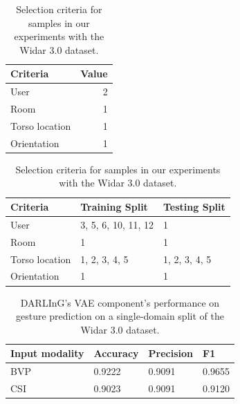 \begin{table}[t]
	\centering
	\begin{subtable}{0.3\textwidth}
		\centering
		\begin{tabular}{@{}lr@{}}
			\toprule
			Criteria       & Value \\ \midrule
			User           & 2     \\
			Room           & 1     \\
			Torso location & 1     \\
			Orientation    & 1     \\ \bottomrule
		\end{tabular}
		\caption{Single-domain split criteria.}
		\label{tab:single-domain-select}
	\end{subtable}
	\hfill
	\begin{subtable}{0.68\textwidth}
		\centering
		\begin{tabular}{@{}lll@{}}
			\toprule
			Criteria       & Training Split      & Testing Split \\ \midrule
			User           & 3, 5, 6, 10, 11, 12 & 1             \\
			Room           & 1                   & 1             \\
			Torso location & 1, 2, 3, 4, 5       & 1, 2, 3, 4, 5 \\
			Orientation    & 1                   & 1             \\ \bottomrule
		\end{tabular}
		\caption{Single user leave out criteria.}
		\label{tab:single-user-select}
	\end{subtable}
	\caption{Selection criteria for samples in our experiments with the Widar 3.0 dataset.}

\end{table}

\begin{table}[b]
	\centering
	\begin{tabular}{@{}llll@{}}
		\toprule
		Input modality     & Accuracy & Precision & F1     \\ \midrule
		BVP                & 0.9222   & 0.9091    & 0.9655 \\
		CSI                & 0.9023   & 0.9091    & 0.9120 \\ \bottomrule
	\end{tabular}
	\caption{DARLInG's VAE component's performance on gesture prediction on a single-domain split of the Widar 3.0 dataset.}
	\label{tab:single-domain-performance}
\end{table}

